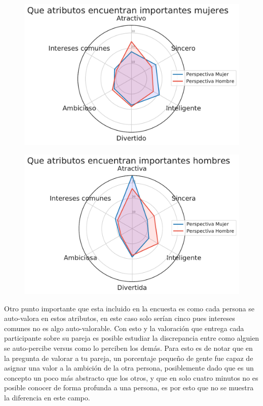 \begin{figure}[H]
\centering
\begin{minipage}{.5\textwidth}
  \centering
  \includegraphics[width=.95\linewidth]{images/attr_females.pdf}
  \label{im:f_seek_m}
\end{minipage}%
\begin{minipage}{.5\textwidth}
  \centering
  \includegraphics[width=.95\linewidth]{images/attr_males.pdf}
  \label{im:m_seek_f}
\end{minipage}
\end{figure}


Otro punto importante que esta incluido en la encuesta es como cada persona se auto-valora en estos atributos, en este caso solo serían cinco pues intereses comunes no es algo auto-valorable. Con esto y la valoración que entrega cada participante sobre su pareja es posible estudiar la discrepancia entre como alguien se auto-percibe versus como lo perciben los demás. Para esto es de notar que en la pregunta de valorar a tu pareja, un porcentaje pequeño de gente fue capaz de asignar una valor a la ambición de la otra persona, posiblemente dado que es un concepto un poco más abstracto que los otros, y que en solo cuatro minutos no es posible conocer de forma profunda a una persona, es por esto que no se muestra la diferencia en este campo.

